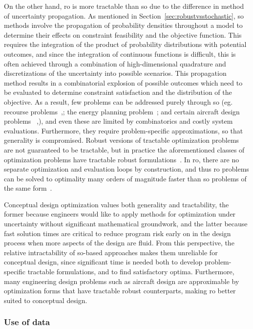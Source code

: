 On the other hand, \gls{ro} is more tractable than \gls{so} due to the difference in method of uncertainty propagation.
As mentioned in Section~\ref{sec:robustvsstochastic},
\gls{so} methods involve the propagation of probability densities throughout a model
to determine their effects on constraint feasibility and the objective function.
This requires the integration of the product of probability distributions with potential outcomes,
and since the integration of continuous functions is difficult, this is often achieved through
a combination of high-dimensional quadrature and discretizations of the uncertainty into
possible scenarios. This propagation method
results in a combinatorial explosion of possible outcomes which need to be evaluated to determine constraint
satisfaction and the distribution of the objective. As a result, few problems can be addressed purely
through \gls{so}
(eg. recourse problems~\cite{Kall1982},\cite{Higle1991}; the energy planning problem~\cite{Pereira1991};
and certain aircraft design problems ~\cite{Liem2015},\cite{Liem2017}), and
even these are limited by combinatorics and costly system evaluations. Furthermore, they require
problem-specific approximations, so that generality is compromised.
Robust versions of tractable optimization problems are not
guaranteed to be tractable, but in practice the aforementioned classes of optimization problems
have tractable robust formulations~\cite{Bertsimas2011}. In \gls{ro},
there are no separate optimization and evaluation
loops by construction, and thus \gls{ro} problems can be solved to optimality
many orders of magnitude faster than \gls{so} problems of the same form~\cite{Bertsimas2011}.

Conceptual design optimization values both generality and tractability, {\color{blue}the former
because engineers would like to
apply methods for optimization under uncertainty without significant mathematical groundwork,
and the latter because fast solution times are critical
to reduce program risk early on in the design process when more aspects
of the design are fluid.} From this perspective, the relative intractability of
\gls{so}-based approaches makes them unreliable for conceptual design, since significant time is
needed both to develop problem-specific tractable formulations, and to find satisfactory optima.
Furthermore,
many engineering design problems such as aircraft design are approximable by optimization
forms that have tractable robust counterparts, making \gls{ro} better suited
to conceptual design.

\subsubsection{Use of data}

